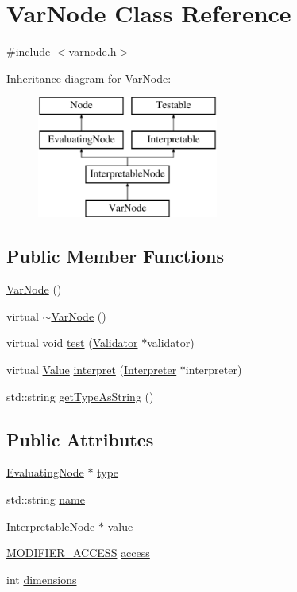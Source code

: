 \hypertarget{classVarNode}{}\section{Var\+Node Class Reference}
\label{classVarNode}


{\ttfamily \#include $<$varnode.\+h$>$}

Inheritance diagram for Var\+Node\+:\begin{figure}[H]
\begin{center}
\leavevmode
\includegraphics[height=4.000000cm]{classVarNode}
\end{center}
\end{figure}
\subsection*{Public Member Functions}
\begin{DoxyCompactItemize}
\item 
\hyperlink{classVarNode_a86b94143b89fc73a69cafb025415689f}{Var\+Node} ()
\item 
virtual \hyperlink{classVarNode_aab6e763704273c00cd756edbdd0b13df}{$\sim$\+Var\+Node} ()
\item 
virtual void \hyperlink{classVarNode_afaca674319775ae5e8a4fb0e5ec7b59f}{test} (\hyperlink{classValidator}{Validator} $\ast$validator)
\item 
virtual \hyperlink{classValue}{Value} \hyperlink{classVarNode_af2eed4fcade96d174c5b1f623b6bcdf6}{interpret} (\hyperlink{classInterpreter}{Interpreter} $\ast$interpreter)
\item 
std\+::string \hyperlink{classVarNode_afcde838758181438e89f8f91699c9d5b}{get\+Type\+As\+String} ()
\end{DoxyCompactItemize}
\subsection*{Public Attributes}
\begin{DoxyCompactItemize}
\item 
\hyperlink{classEvaluatingNode}{Evaluating\+Node} $\ast$ \hyperlink{classVarNode_a8aff9f630482d9f8570dd9feb10849cd}{type}
\item 
std\+::string \hyperlink{classVarNode_adcfff85229e23fb0670fa3fc14b830e0}{name}
\item 
\hyperlink{classInterpretableNode}{Interpretable\+Node} $\ast$ \hyperlink{classVarNode_a58798cdece4226f1e0b844c8cbcd5146}{value}
\item 
\hyperlink{statics_8h_a0cbe4939ec6da73b52afbebd794d60ba}{M\+O\+D\+I\+F\+I\+E\+R\+\_\+\+A\+C\+C\+E\+SS} \hyperlink{classVarNode_a9d3115ee1b8fde5fe1b9484b57dba54a}{access}
\item 
int \hyperlink{classVarNode_a408a93fc558984318fb6fdad5cb36077}{dimensions}
\end{DoxyCompactItemize}
